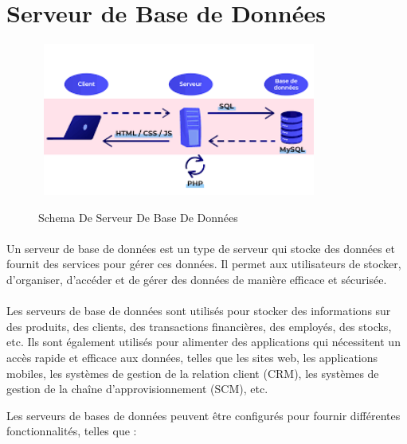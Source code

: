 \section{Serveur de Base de Données }
	\begin{figure}[h]
		
		\hbox{
	\includegraphics[width=0.8\textwidth]{PhotoMemoire/serveur_bdd.png}}
\caption{Schema De Serveur De Base De Données}
\end{figure}
\paragraph{ }
Un serveur de base de données est un type de serveur qui stocke des données et fournit des services pour gérer ces données. Il permet aux utilisateurs de stocker, d'organiser, d'accéder et de gérer des données de manière efficace et sécurisée.
\paragraph{ }
Les serveurs de base de données sont utilisés pour stocker des informations sur des produits, des clients, des transactions financières, des employés, des stocks, etc. Ils sont également utilisés pour alimenter des applications qui nécessitent un accès rapide et efficace aux données, telles que les sites web, les applications mobiles, les systèmes de gestion de la relation client (CRM), les systèmes de gestion de la chaîne d'approvisionnement (SCM), etc.

Les serveurs de bases de données peuvent être configurés pour fournir différentes fonctionnalités, telles que :

